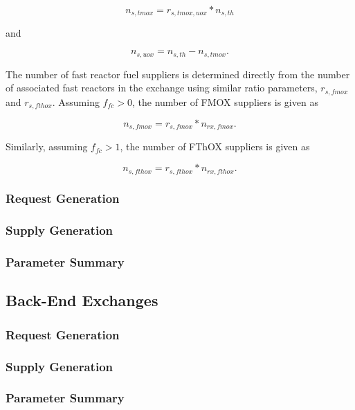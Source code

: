 \begin{equation}
n_{s, tmox} = r_{s, tmox, uox} * n_{s, th}
\end{equation}

and

\begin{equation}
n_{s, uox} = n_{s, th} - n_{s, tmox}.
\end{equation}

The number of fast reactor fuel suppliers is determined directly from the number
of associated fast reactors in the exchange using similar ratio parameters,
$r_{s, fmox}$ and $r_{s, fthox}$. Assuming $f_{fc} > 0$, the number of FMOX
suppliers is given as

\begin{equation}
n_{s, fmox} = r_{s, fmox} * n_{rx, fmox}.
\end{equation}

Similarly, assuming $f_{fc} > 1$, the number of FThOX suppliers is given as  

\begin{equation}
n_{s, fthox} = r_{s, fthox} * n_{rx, fthox}.
\end{equation}

\subsubsection{Request Generation}

\subsubsection{Supply Generation}

\subsubsection{Parameter Summary}

\subsection{Back-End Exchanges}\label{method:setup:back}

\subsubsection{Request Generation}

\subsubsection{Supply Generation}

\subsubsection{Parameter Summary}
